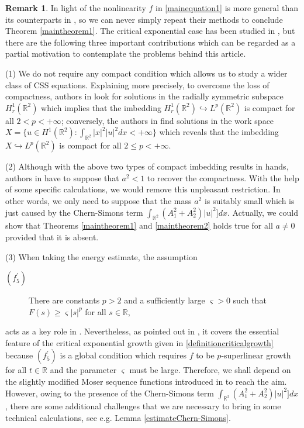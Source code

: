 \documentclass[11pt]{amsart}
\numberwithin{equation}{section}
\theoremstyle{definition}
\newtheorem{remark}[theorem]{Remark}
\newcommand{\R}{\mathbb{R}}
\begin{document}
\begin{remark}
In light of the nonlinearity $f$ in \eqref{mainequation1} is more general than its counterparts in
\cite{LX,LC,GZ}, so we can never simply repeat their methods to conclude Theorem \ref{maintheorem1}.
The critical exponential case has been studied in \cite{YCS1,YTC}, but there are
the following three important contributions which can be regarded as a partial motivation to
contemplate the problems behind this article.

(1) We do not require any compact condition which allows us to study a wider class of CSS equations.
Explaining more precisely, to overcome the loss of compactness, authors in \cite{YTC} look for solutions
in the radially symmetric subspace $H_r^1(\R^2)$ which implies that the imbedding $H^1_r(\R^2)\hookrightarrow L^p(\R^2)$
is compact for all $2<p<+\infty$; conversely, the authors in \cite{YCS1} find solutions in the work space
$X=\{u\in H^1(\R^2):\int_{\R^2}|x|^2|u|^2dx<+\infty\}$ which reveals that the imbedding $X\hookrightarrow L^p(\R^2)$
is compact for all $2\leq p<+\infty$.

(2) Although with the above two types of compact imbedding results in hands, authors in
\cite{YCS1,YTC} have to suppose that $a^2<1$ to recover the compactness. With the help of some specific calculations,
we would remove this unpleasant restriction. In other words, we only need to suppose that the mass $a^2$ is suitably small which is just
caused by the Chern-Simons term $\int_{\R^2} (A_1^2+A_2^2)|u|^2]dx$. Actually, we could show that
Theorems \ref{maintheorem1} and \ref{maintheorem2} holds true for all $a\neq0$ provided that it is absent.

(3) When taking the energy estimate, the assumption
\begin{description}
\item[$(f_5^\prime)$] There are constants $p>2$ and a sufficiently large $\varsigma>0$ such that $F(s)\geq\varsigma|s|^p$ for all $s\in\R$,
\end{description}
acts as a key role in \cite{YCS1,YTC}. Nevertheless, as pointed out in \cite{AS},
it covers the
essential feature of the critical exponential growth given in \eqref{definitioncriticalgrowth}
because $(f_5^\prime)$ is a global condition which requires $f$ to be $p$-superlinear growth for all
$t\in\R$ and the parameter $\varsigma$ must be large. Therefore, we shall depend on the slightly modified Moser
sequence functions introduced in \cite{AS} to reach the aim.
However, owing to the presence of the Chern-Simons term $\int_{\R^2} (A_1^2+A_2^2)|u|^2]dx$,
there are some additional challenges that we are necessary to bring in some technical calculations,
see e.g. Lemma \ref{estimateChern-Simons}.
\end{remark}
\end{document}
